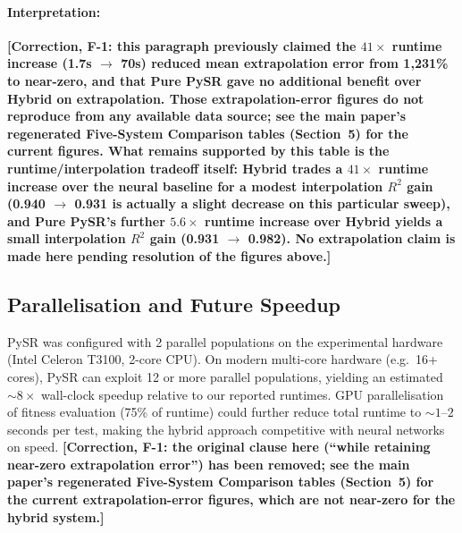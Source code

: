 \documentclass[twoside,11pt]{article}
\begin{document}
\paragraph{Interpretation:} \textbf{[Correction, F-1: this paragraph
previously claimed the $41\times$ runtime increase (1.7s $\to$ 70s) reduced
mean extrapolation error from 1{,}231\% to near-zero, and that Pure PySR
gave no additional benefit over Hybrid on extrapolation. Those
extrapolation-error figures do not reproduce from any available data
source; see the main paper's regenerated Five-System Comparison tables
(Section~5) for the current figures. What remains supported by this
table is the runtime/interpolation tradeoff itself: Hybrid trades a
$41\times$ runtime increase over the neural baseline for a modest
interpolation $R^2$ gain (0.940 $\to$ 0.931 is actually a slight decrease
on this particular sweep), and Pure PySR's further $5.6\times$ runtime
increase over Hybrid yields a small interpolation $R^2$ gain (0.931 $\to$
0.982). No extrapolation claim is made here pending resolution of the
figures above.]}

\subsection{Parallelisation and Future Speedup}

PySR was configured with 2 parallel populations on the experimental hardware (Intel Celeron T3100, 2-core CPU). On modern multi-core hardware (e.g.\ 16+ cores), PySR can exploit 12 or more parallel populations, yielding an estimated ${\sim}8\times$ wall-clock speedup relative to our reported runtimes. GPU parallelisation of fitness evaluation (75\% of runtime) could further reduce total runtime to ${\sim}1$--$2$ seconds per test, making the hybrid approach competitive with neural networks on speed. \textbf{[Correction, F-1: the original clause here (``while retaining near-zero extrapolation error'') has been removed; see the main paper's regenerated Five-System Comparison tables (Section~5) for the current extrapolation-error figures, which are not near-zero for the hybrid system.]}


\end{document}
